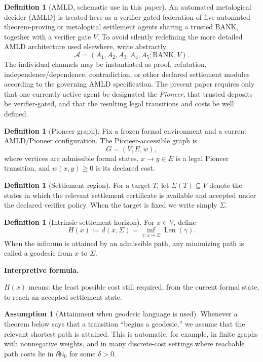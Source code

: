 \documentclass[11pt]{article}
\theoremstyle{definition}
\newtheorem{definition}[theorem]{Definition}
\newtheorem{assumption}[theorem]{Assumption}
\theoremstyle{remark}
\newcommand{\BANK}{\mathrm{BANK}}
\newcommand{\Sett}{\Sigma}
\newenvironment{interpretiveformula}{%
  \begin{center}\begin{minipage}{0.92\linewidth}\small
  \textbf{Interpretive formula.}\ \raggedright}{\end{minipage}\end{center}}
\begin{document}
\begin{definition}[AMLD, schematic use in this paper]
An automated metalogical decider (AMLD) is treated here as a verifier-gated federation of five automated theorem-proving or metalogical settlement agents sharing a trusted $\BANK$, together with a verifier gate $V$. To avoid silently redefining the more detailed AMLD architecture used elsewhere, write abstractly
\[
\mathcal A=(A_1,A_2,A_3,A_4,A_5;\BANK,V).
\]
The individual channels may be instantiated as proof, refutation, independence/dependence, contradiction, or other declared settlement modules according to the governing AMLD specification. The present paper requires only that one currently active agent be designated the \emph{Pioneer}, that trusted deposits be verifier-gated, and that the resulting legal transitions and costs be well defined.
\end{definition}

\begin{definition}[Pioneer graph]
Fix a frozen formal environment and a current AMLD/Pioneer configuration. The Pioneer-accessible graph is
\[
G=(V,E,w),
\]
where vertices are admissible formal states, $x\to y\in E$ is a legal Pioneer transition, and $w(x,y)\ge 0$ is its declared cost.
\end{definition}

\begin{definition}[Settlement region]
For a target $T$, let $\Sett(T)\subseteq V$ denote the states in which the relevant settlement certificate is available and accepted under the declared verifier policy. When the target is fixed we write simply $\Sett$.
\end{definition}

\begin{definition}[Intrinsic settlement horizon]
For $x\in V$, define
\[
H(x):=d(x,\Sett)=\inf_{\gamma:x\leadsto \Sett}\operatorname{Len}(\gamma).
\]
When the infimum is attained by an admissible path, any minimizing path is called a geodesic from $x$ to $\Sett$.
\end{definition}

\begin{interpretiveformula}
$H(x)$ means: the least possible cost still required, from the current formal state, to reach an accepted settlement state.
\end{interpretiveformula}

\begin{assumption}[Attainment when geodesic language is used]
Whenever a theorem below says that a transition ``begins a geodesic,'' we assume that the relevant shortest path is attained. This is automatic, for example, in finite graphs with nonnegative weights, and in many discrete-cost settings where reachable path costs lie in $\delta\mathbb N_0$ for some $\delta>0$.
\end{assumption}
\end{document}
